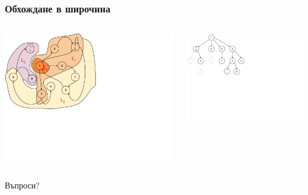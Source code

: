 \documentclass{beamer}
\begin{document}
\begin{frame}[fragile]
\frametitle{Обхождане в широчина}
 

\begin{columns}[t]
  \begin{column}{0.65\textwidth}
 \includegraphics[width=13cm]{images/graph_levels}
 \end{column}
  \begin{column}{0.35\textwidth}
  \includegraphics[width=9cm]{images/graph_span}
  \end{column}
\end{columns}

 

\end{frame}


\begin{frame}
\centerline{Въпроси?}
\end{frame}
\end{document}

